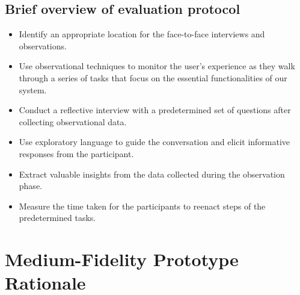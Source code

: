 \documentclass[manuscript, screen, nonacm]{acmart}
\begin{document}
\subsection{Brief overview of evaluation protocol}
\begin{itemize}
    \item Identify an appropriate location for the face-to-face interviews and observations.
    \item Use observational techniques to monitor the user's experience as they walk through a series of tasks that focus on the essential functionalities of our system.
    \item Conduct a reflective interview with a predetermined set of questions after collecting observational data.
    \item Use exploratory language to guide the conversation and elicit informative responses from the participant.
    \item Extract valuable insights from the data collected during the observation phase.
    \item Measure the time taken for the participants to reenact steps of the predetermined tasks.
\end{itemize}








\newpage

\section{Medium-Fidelity Prototype Rationale}
\end{document}
